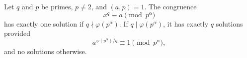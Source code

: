 Let $q$ and $p$ be primes, $p \neq 2$, and $(a, p) = 1$. The congruence
$$x^q \equiv a \pmod{p^\alpha}$$
has exactly one solution if $q \nmid \varphi(p^\alpha)$. If $q \mid \varphi(p^\alpha)$, it has exactly $q$ solutions provided
$$a^{\varphi(p^\alpha)/q} \equiv 1 \pmod{p^\alpha},$$
and no solutions otherwise.
